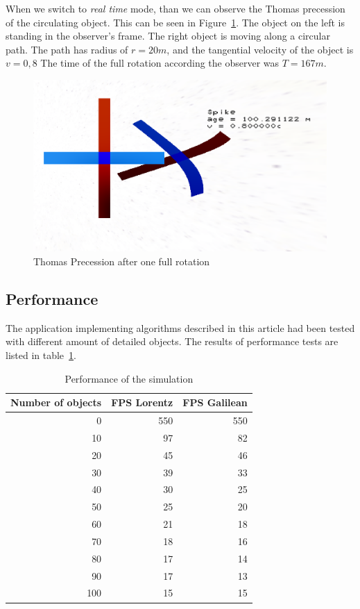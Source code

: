 \documentclass{egpubl}
\begin{document}
When we switch to \emph{real time} mode, than we can observe the Thomas precession of the circulating object. This can be seen in Figure~\ref{fig:thomasPrec}. The object on the left is standing in the observer's frame. The right object is moving along a circular path. The path has radius of $r=20m$, and the tangential velocity of the object is $v=0,8$
The time of the full rotation according the observer was $T=167m$.
\begin{figure}[htb]
  	\centering
	\includegraphics[width=.95\linewidth]{figures/ThomasPrecession.eps}
	\caption{Thomas Precession after one full rotation}
	\label{fig:thomasPrec}
\end{figure}

\FloatBarrier

\subsection{Performance}
The application implementing algorithms described in this article had been tested with different amount of detailed objects. The results of performance tests are listed in table~\ref{tab:performance}.
\begin{table}
\caption{Performance of the simulation}
\label{tab:performance}
\begin{tabular}{|r|r|r|}
\hline
Number of objects & FPS Lorentz & FPS Galilean\\
\hline
\hline
0&550&550\\
\hline
10&97&82\\
\hline
20&45&46\\
\hline
30&39&33\\
\hline
40&30&25\\
\hline
50&25&20\\
\hline
60&21&18\\
\hline
70&18&16\\
\hline
80&17&14\\
\hline
90&17&13\\
\hline
100&15&15\\
\hline
\end{tabular}

\end{table}
\end{document}
